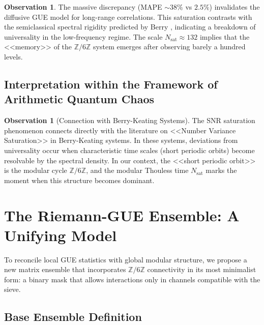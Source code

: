 \documentclass[12pt, a4paper]{article}
\theoremstyle{plain}
\theoremstyle{definition}
\newtheorem{observacion}[teorema]{Observation}
\theoremstyle{remark}
\newcommand{\Z}{\mathbb{Z}}
\begin{document}
\begin{observacion}
The massive discrepancy (MAPE $\sim 38\%$ vs $2.5\%$) invalidates the diffusive GUE model for long-range correlations. This saturation contrasts with the semiclassical spectral rigidity predicted by Berry \cite{berry1985}, indicating a breakdown of universality in the low-frequency regime. The scale $N_{\text{sat}} \approx 132$ implies that the <<memory>> of the $\Z/6\Z$ system emerges after observing barely a hundred levels.
\end{observacion}


\subsection{Interpretation within the Framework of Arithmetic Quantum Chaos}
\label{subsec:caos_cuantico_interpretacion}

\begin{observacion}[Connection with Berry-Keating Systems]
\label{obs:conexion_berry_keating}
The SNR saturation phenomenon connects directly with the literature on 
<<Number Variance Saturation>> in Berry-Keating systems. In these 
systems, deviations from universality occur when characteristic time 
scales (short periodic orbits) become resolvable by the spectral 
density. In our context, the <<short periodic orbit>> is the 
modular cycle $\mathbb{Z}/6\mathbb{Z}$, and the modular Thouless time 
$N_{\text{sat}}$ marks the moment when this structure becomes dominant.
\end{observacion}

\section{The Riemann-GUE Ensemble: A Unifying Model}
\label{sec:ensemble_riemann}

To reconcile local GUE statistics with global modular structure, we propose a new matrix ensemble that incorporates $\Z/6\Z$ connectivity in its most minimalist form: a binary mask that allows interactions only in channels compatible with the sieve.

\subsection{Base Ensemble Definition}
\label{subsec:definicion_ensemble}
\end{document}
